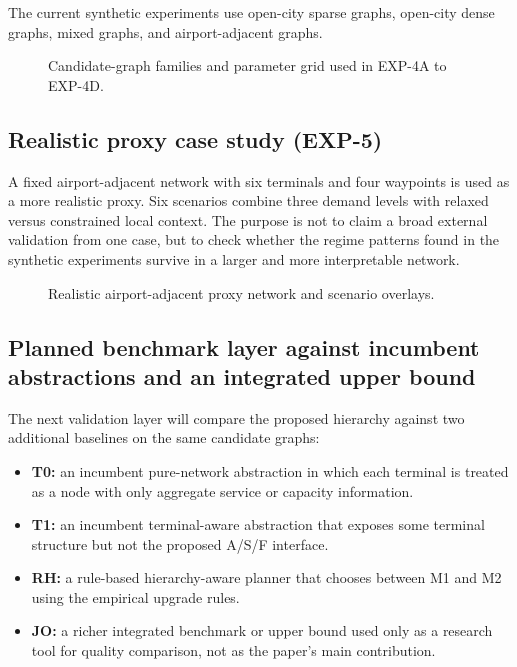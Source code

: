 \documentclass[review,authoryear]{elsarticle}
\begin{document}
The current synthetic experiments use open-city sparse graphs, open-city dense graphs, mixed graphs, and airport-adjacent graphs.

\begin{figure}[htbp]
  \centering
  \caption{Candidate-graph families and parameter grid used in EXP-4A to EXP-4D.}
  \label{fig:graph_families}
\end{figure}

\subsection{Realistic proxy case study (EXP-5)}
\label{sec:exp:proxy}

A fixed airport-adjacent network with six terminals and four waypoints is used as a more realistic proxy. Six scenarios combine three demand levels with relaxed versus constrained local context. The purpose is not to claim a broad external validation from one case, but to check whether the regime patterns found in the synthetic experiments survive in a larger and more interpretable network.

\begin{figure}[htbp]
  \centering
  \caption{Realistic airport-adjacent proxy network and scenario overlays.}
  \label{fig:proxy}
\end{figure}

\subsection{Planned benchmark layer against incumbent abstractions and an integrated upper bound}
\label{sec:exp:benchmark}

The next validation layer will compare the proposed hierarchy against two additional baselines on the same candidate graphs:
\begin{itemize}
  \item \textbf{T0:} an incumbent pure-network abstraction in which each terminal is treated as a node with only aggregate service or capacity information.
  \item \textbf{T1:} an incumbent terminal-aware abstraction that exposes some terminal structure but not the proposed A/S/F interface.
  \item \textbf{RH:} a rule-based hierarchy-aware planner that chooses between M1 and M2 using the empirical upgrade rules.
  \item \textbf{JO:} a richer integrated benchmark or upper bound used only as a research tool for quality comparison, not as the paper's main contribution.
\end{itemize}
\end{document}
